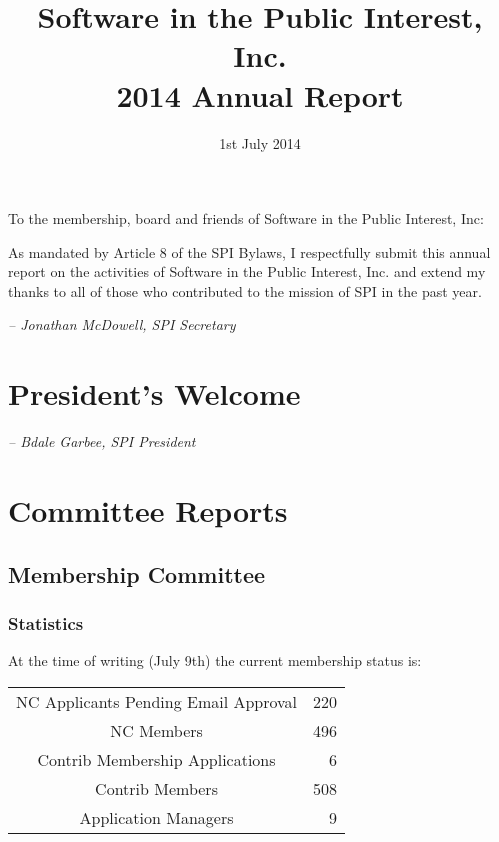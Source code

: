 \documentclass[letterpaper]{report}
\begin{document}
\title{Software in the Public Interest, Inc.\\
2014 Annual Report}
\date{1st July 2014}

\maketitle

To the membership, board and friends of Software in the Public Interest, Inc:

As mandated by Article 8 of the SPI Bylaws, I respectfully submit this annual
report on the activities of Software in the Public Interest, Inc. and extend my
thanks to all of those who contributed to the mission of SPI in the past year.

  \emph{-- Jonathan McDowell, SPI Secretary}

\newpage

\tableofcontents

\newpage

\chapter{President's Welcome}
\label{sec:president}

  \emph{-- Bdale Garbee, SPI President}

\chapter{Committee Reports}
\section{Membership Committee}

\subsection{Statistics}

At the time of writing (July 9th) the current membership status is:

\begin{tabular}{ | c | r | }
\hline
NC Applicants Pending Email Approval	& 220 \\
NC Members				& 496 \\
Contrib Membership Applications		& 6 \\
Contrib Members				& 508 \\
Application Managers			& 9 \\
\hline
\end{tabular}
\end{document}
